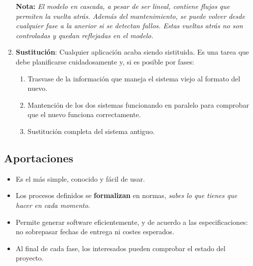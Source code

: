 \begin{enumerate}
   \textbf{Nota:} \textit{El modelo en cascada, a pesar de ser lineal, contiene flujos que permiten la vuelta atrás. Además del mantenimiento, se puede volver desde cualquier fase a la anerior si se detectan fallos. Estas vueltas atrás no son controladas y quedan reflejadas en el modelo.}

  \item \textbf{Sustitución}: Cualquier aplicación acaba siendo sistituida. Es una tarea que debe planificarse cuidadosamente y, si es posible por fases:
  
  \begin{enumerate}
      \item Trasvase de la información que maneja el sistema viejo al formato del nuevo.
      \item Mantención de los dos sistemas funcionando en paralelo para comprobar que el nuevo funciona correctamente.
      \item Sustitución completa del sistema antiguo.
  \end{enumerate}
\end{enumerate}

\subsection{Aportaciones}
\begin{itemize}
   \item Es el más simple, conocido y fácil de usar.
   \item Los procesos definidos se \textbf{formalizan} en normas, \textit{sabes lo que tienes que hacer en cada momento}.
   \item Permite generar software eficientemente, y de acuerdo a las especificaciones: no sobrepasar fechas de entrega ni costes esperados.
   \item Al final de cada fase, los interesados pueden comprobar el estado del proyecto.
\end{itemize}

